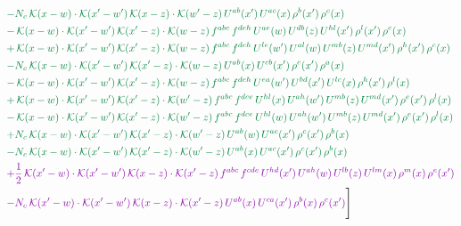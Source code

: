 \documentclass[10pt]{article}
\numberwithin{equation}{section}
\begin{document}
\begin{align}
&{\color{JIM} -N_{c}\,\mathcal{K}(x-w)\cdot\mathcal{K}(x'-w')\,\mathcal{K}(x-z)\cdot\mathcal{K}(w'-z)\,U^{ab}(x')\,U^{ac}(x)\,\rho^{b}(x')\,\rho^{c}(x)} \notag\\
&{\color{JIM} -\,\mathcal{K}(x-w)\cdot\mathcal{K}(x'-w')\,\mathcal{K}(x'-z)\cdot\mathcal{K}(w-z)\,f^{abc}\,f^{deh}\,U^{ae}(w)\,U^{db}(z)\,U^{hl}(x')\,\rho^{l}(x')\,\rho^{c}(x)} \notag\\
&{\color{JIM} +\,\mathcal{K}(x-w)\cdot\mathcal{K}(x'-w')\,\mathcal{K}(x'-z)\cdot\mathcal{K}(w-z)\,f^{abc}\,f^{deh}\,U^{le}(w')\,U^{al}(w)\,U^{mb}(z)\,U^{md}(x')\,\rho^{h}(x')\,\rho^{c}(x)} \notag\\
&{\color{JIM} -N_{c}\,\mathcal{K}(x-w)\cdot\mathcal{K}(x'-w')\,\mathcal{K}(x'-z)\cdot\mathcal{K}(w-z)\,U^{ab}(x)\,U^{cb}(x')\,\rho^{c}(x')\,\rho^{a}(x)} \notag\\
&{\color{JIM} -\,\mathcal{K}(x-w)\cdot\mathcal{K}(x'-w')\,\mathcal{K}(x'-z)\cdot\mathcal{K}(w-z)\,f^{abc}\,f^{deh}\,U^{ea}(w')\,U^{bd}(x')\,U^{lc}(x)\,\rho^{h}(x')\,\rho^{l}(x)} \notag\\
&{\color{JIM} +\,\mathcal{K}(x-w)\cdot\mathcal{K}(x'-w')\,\mathcal{K}(x'-z)\cdot\mathcal{K}(w'-z)\,f^{abc}\,f^{dce}\,U^{hl}(x)\,U^{ah}(w')\,U^{mb}(z)\,U^{md}(x')\,\rho^{e}(x')\,\rho^{l}(x)} \notag\\
&{\color{JIM} -\,\mathcal{K}(x-w)\cdot\mathcal{K}(x'-w')\,\mathcal{K}(x'-z)\cdot\mathcal{K}(w'-z)\,f^{abc}\,f^{dce}\,U^{hl}(w)\,U^{ah}(w')\,U^{mb}(z)\,U^{md}(x')\,\rho^{e}(x')\,\rho^{l}(x)} \notag\\
&{\color{JIM} +N_{c}\,\mathcal{K}(x-w)\cdot\mathcal{K}(x'-w')\,\mathcal{K}(x'-z)\cdot\mathcal{K}(w'-z)\,U^{ab}(w)\,U^{ac}(x')\,\rho^{c}(x')\,\rho^{b}(x)} \notag\\
&{\color{JIM} -N_{c}\,\mathcal{K}(x-w)\cdot\mathcal{K}(x'-w')\,\mathcal{K}(x'-z)\cdot\mathcal{K}(w'-z)\,U^{ab}(x)\,U^{ac}(x')\,\rho^{c}(x')\,\rho^{b}(x)} \notag\\
&{\color{CC} +\frac{1}{2}\,\mathcal{K}(x'-w)\cdot\mathcal{K}(x'-w')\,\mathcal{K}(x-z)\cdot\mathcal{K}(x'-z)\,f^{abc}\,f^{cde}\,U^{hd}(x')\,U^{ah}(w)\,U^{lb}(z)\,U^{lm}(x)\,\rho^{m}(x)\,\rho^{e}(x')} \notag\\
&{\color{CC} -N_{c}\,\mathcal{K}(x'-w)\cdot\mathcal{K}(x'-w')\,\mathcal{K}(x-z)\cdot\mathcal{K}(x'-z)\,U^{ab}(x)\,U^{ca}(x')\,\rho^{b}(x)\,\rho^{c}(x')}\Bigg] \end{align}
\end{document}
